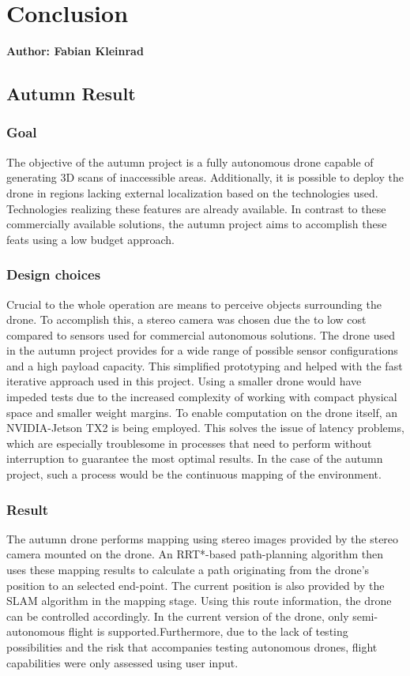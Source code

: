 \chapter{Conclusion}

\textbf{Author: Fabian Kleinrad} 

\section{Autumn Result}

\subsection{Goal}
The objective of the autumn project is a fully autonomous drone capable of generating 3D scans of inaccessible areas. Additionally, it is possible to deploy the drone in regions lacking external localization based on the technologies used. Technologies realizing these features are already available. In contrast to these commercially available solutions, the autumn project aims to accomplish these feats using a low budget approach. 

\subsection{Design choices}
Crucial to the whole operation are means to perceive objects surrounding the drone. To accomplish this, a stereo camera was chosen due the to low cost compared to sensors used for commercial autonomous solutions.\newline
The drone used in the autumn project provides for a wide range of possible sensor configurations and a high payload capacity. This simplified prototyping and helped with the fast iterative approach used in this project. Using a smaller drone would have impeded tests due to the increased complexity of working with compact physical space and smaller weight margins.\newline
To enable computation on the drone itself, an NVIDIA-Jetson TX2 is being employed. This solves the issue of latency problems, which are especially troublesome in processes that need to perform without interruption to guarantee the most optimal results. In the case of the autumn project, such a process would be the continuous mapping of the environment.
\pagebreak
\subsection{Result}
The autumn drone performs mapping using stereo images provided by the stereo camera mounted on the drone. An RRT*-based path-planning algorithm then uses these mapping results to calculate a path originating from the drone's position to an selected end-point. The current position is also provided by the SLAM algorithm in the mapping stage. Using this route information, the drone can be controlled accordingly.
In the current version of the drone, only semi-autonomous flight is supported.Furthermore, due to the lack of testing possibilities and the risk that accompanies testing autonomous drones, flight capabilities were only assessed using user input.

